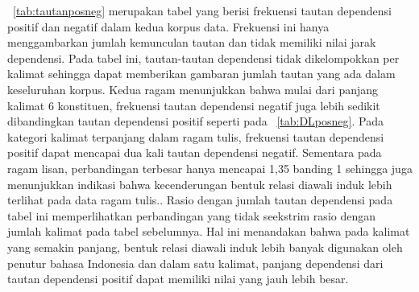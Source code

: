 \tab~\ref{tab:tautanposneg} merupakan tabel yang berisi frekuensi tautan dependensi positif dan negatif dalam kedua korpus data. Frekuensi ini hanya menggambarkan jumlah kemunculan tautan dan tidak memiliki nilai jarak dependensi. Pada tabel ini, tautan-tautan dependensi tidak dikelompokkan per kalimat sehingga dapat memberikan gambaran jumlah tautan yang ada dalam keseluruhan korpus. Kedua ragam menunjukkan bahwa mulai dari panjang kalimat 6 konstituen, frekuensi tautan dependensi negatif juga lebih sedikit dibandingkan tautan dependensi positif seperti pada \tab~\ref{tab:DLposneg}. Pada kategori kalimat terpanjang dalam ragam tulis, frekuensi tautan dependensi positif dapat mencapai dua kali tautan dependensi negatif. Sementara pada ragam lisan, perbandingan terbesar hanya mencapai 1,35 banding 1 sehingga juga menunjukkan indikasi bahwa kecenderungan bentuk relasi diawali induk lebih terlihat pada data ragam tulis.. Rasio dengan jumlah tautan dependensi pada tabel ini memperlihatkan perbandingan yang tidak seekstrim rasio dengan jumlah kalimat pada tabel sebelumnya. Hal ini menandakan bahwa pada kalimat yang semakin panjang, bentuk relasi diawali induk lebih banyak digunakan oleh penutur bahasa Indonesia dan dalam satu kalimat, panjang dependensi dari tautan dependensi positif dapat memiliki nilai yang jauh lebih besar.

